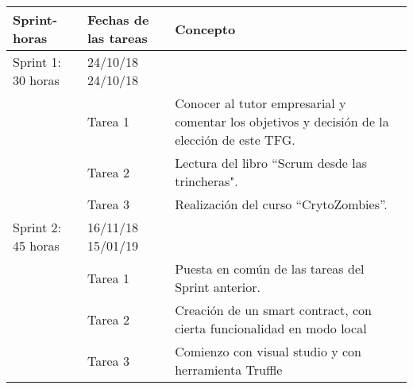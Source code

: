 \begin{table}[H]
\begin{tabular}{|p{1.5cm}|p{1.5cm}|p{5cm}}
\hline
\textbf{Sprint- horas} &  \textbf{Fechas de las tareas} & \multicolumn{1}{l|}{\textbf{Concepto}}                                                                                    \\ \hline
Sprint 1: 30 horas       & 24/10/18 24/10/18           &                                                                                                                   \\ \hline
               & Tarea 1             & \multicolumn{1}{p{9.2cm}|}{Conocer al tutor empresarial y comentar los objetivos y decisión de la elección de este TFG.} \\ \hline
                         & Tarea 2                       & \multicolumn{1}{p{9.2cm}|}{Lectura del libro “Scrum desde las trincheras".}                                              \\ \hline
                         & Tarea 3                       & \multicolumn{1}{p{9.2cm}|}{Realización del curso “CrytoZombies”.}                                                        \\ \hline
Sprint 2: 45 horas       & 16/11/18 15/01/19           & \multicolumn{1}{p{9.2cm}|}{}                                                                                             \\ \hline
                         & Tarea 1                       & \multicolumn{1}{p{9.2cm}|}{Puesta en común de las tareas del Sprint anterior.}                                  \\ \hline
                         & Tarea 2                       & \multicolumn{1}{p{9.2cm}|}{Creación de un smart contract, con cierta funcionalidad en modo local}               \\ \hline
                         & Tarea 3                       & \multicolumn{1}{p{9.2cm}|}{Comienzo con visual studio y con herramienta Truffle}                                \\ \hline 


\end{tabular}
\end{table}
